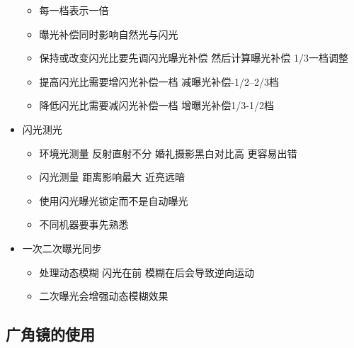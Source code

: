 \documentclass[
  letterpaper,
  DIV=11,
  numbers=noendperiod]{scrreprt}
\providecommand{\tightlist}{%
  \setlength{\itemsep}{0pt}\setlength{\parskip}{0pt}}\usepackage{longtable,booktabs,array}
\begin{document}
\begin{itemize}
  \begin{itemize}
  \tightlist
  \item
    每一档表示一倍
  \item
    曝光补偿同时影响自然光与闪光
  \item
    保持或改变闪光比要先调闪光曝光补偿 然后计算曝光补偿 1/3一档调整
  \item
    提高闪光比需要增闪光补偿一档 减曝光补偿-1/2--2/3档
  \item
    降低闪光比需要减闪光补偿一档 增曝光补偿1/3-1/2档
  \end{itemize}
\item
  闪光测光

  \begin{itemize}
  \tightlist
  \item
    环境光测量 反射直射不分 婚礼摄影黑白对比高 更容易出错
  \item
    闪光测量 距离影响最大 近亮远暗
  \item
    使用闪光曝光锁定而不是自动曝光
  \item
    不同机器要事先熟悉
  \end{itemize}
\item
  一次二次曝光同步

  \begin{itemize}
  \tightlist
  \item
    处理动态模糊 闪光在前 模糊在后会导致逆向运动
  \item
    二次曝光会增强动态模糊效果
  \end{itemize}
\end{itemize}

\subsection{广角镜的使用}\label{ux5e7fux89d2ux955cux7684ux4f7fux7528}
\end{document}
